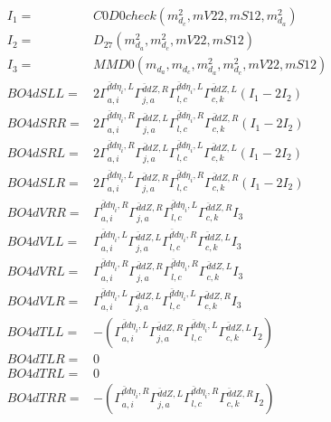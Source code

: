 \documentclass[A4,landscape]{article}
\begin{document}
\begin{align} 
I_1 = & C0D0check(m^2_{d_{{c}}}, mV22, mS12, m^2_{d_{{a}}}) \\ 
I_2 = & D_{27}(m^2_{d_{{a}}}, m^2_{d_{{c}}}, mV22, mS12) \\ 
I_3 = & MMD0(m_{d_{{a}}}, m_{d_{{c}}}, m^2_{d_{{a}}}, m^2_{d_{{c}}}, mV22, mS12) \\ 
  BO4dSLL= & 2  \Gamma^{\bar{d}d \eta_i ,L}_{a, i} \Gamma^{\bar{d}d Z ,R}_{j, a} \Gamma^{\bar{d}d \eta_i ,L}_{l, c} \Gamma^{\bar{d}d Z ,L}_{c, k} (I_1 - 2 I_2) \\ 
  BO4dSRR= & 2  \Gamma^{\bar{d}d \eta_i ,R}_{a, i} \Gamma^{\bar{d}d Z ,L}_{j, a} \Gamma^{\bar{d}d \eta_i ,R}_{l, c} \Gamma^{\bar{d}d Z ,R}_{c, k} (I_1 - 2 I_2) \\ 
  BO4dSRL= & 2  \Gamma^{\bar{d}d \eta_i ,R}_{a, i} \Gamma^{\bar{d}d Z ,L}_{j, a} \Gamma^{\bar{d}d \eta_i ,L}_{l, c} \Gamma^{\bar{d}d Z ,L}_{c, k} (I_1 - 2 I_2) \\ 
  BO4dSLR= & 2  \Gamma^{\bar{d}d \eta_i ,L}_{a, i} \Gamma^{\bar{d}d Z ,R}_{j, a} \Gamma^{\bar{d}d \eta_i ,R}_{l, c} \Gamma^{\bar{d}d Z ,R}_{c, k} (I_1 - 2 I_2) \\ 
  BO4dVRR= &  \Gamma^{\bar{d}d \eta_i ,R}_{a, i} \Gamma^{\bar{d}d Z ,R}_{j, a} \Gamma^{\bar{d}d \eta_i ,L}_{l, c} \Gamma^{\bar{d}d Z ,R}_{c, k} I_3 \\ 
  BO4dVLL= &  \Gamma^{\bar{d}d \eta_i ,L}_{a, i} \Gamma^{\bar{d}d Z ,L}_{j, a} \Gamma^{\bar{d}d \eta_i ,R}_{l, c} \Gamma^{\bar{d}d Z ,L}_{c, k} I_3 \\ 
  BO4dVRL= &  \Gamma^{\bar{d}d \eta_i ,R}_{a, i} \Gamma^{\bar{d}d Z ,R}_{j, a} \Gamma^{\bar{d}d \eta_i ,R}_{l, c} \Gamma^{\bar{d}d Z ,L}_{c, k} I_3 \\ 
  BO4dVLR= &  \Gamma^{\bar{d}d \eta_i ,L}_{a, i} \Gamma^{\bar{d}d Z ,L}_{j, a} \Gamma^{\bar{d}d \eta_i ,L}_{l, c} \Gamma^{\bar{d}d Z ,R}_{c, k} I_3 \\ 
  BO4dTLL= & -( \Gamma^{\bar{d}d \eta_i ,L}_{a, i} \Gamma^{\bar{d}d Z ,R}_{j, a} \Gamma^{\bar{d}d \eta_i ,L}_{l, c} \Gamma^{\bar{d}d Z ,L}_{c, k} I_2) \\ 
  BO4dTLR= & 0 \\ 
  BO4dTRL= & 0 \\ 
  BO4dTRR= & -( \Gamma^{\bar{d}d \eta_i ,R}_{a, i} \Gamma^{\bar{d}d Z ,L}_{j, a} \Gamma^{\bar{d}d \eta_i ,R}_{l, c} \Gamma^{\bar{d}d Z ,R}_{c, k} I_2) \\ 
\end{align} 
\end{document}
